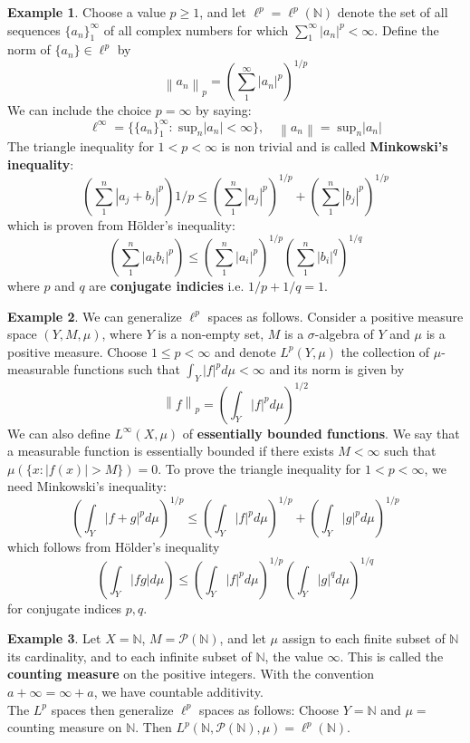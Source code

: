 \documentclass{article}
\theoremstyle{definition}
\newtheorem{example}{Example}
\newcommand{\norm}[1]{\left\lVert#1\right\rVert}
\begin{document}
    \begin{example}
        Choose a value $p\geq 1$, and let $\ell^p = \ell^p(\mathbb{N})$ denote the set of all sequences $\{a_n\}_1^{\infty}$ of all
        complex numbers for which $\sum_1^{\infty} |a_n|^p<\infty$. Define the norm of $\{a_n\}\in \ell^p$ by
        \[ \norm{a_n}_p = (\sum_1^{\infty} |a_n|^p)^{1/p} \]
        We can include the choice $p=\infty$ by saying:
        \[ \ell^{\infty} = \{\{a_n\}_1^{\infty}:\;\text{sup}_n|a_n|<\infty\},\quad \norm{a_n} =\;\text{sup}_n|a_n| \]
        The triangle inequality for $1<p<\infty$ is non trivial and is called \textbf{Minkowski's inequality}:
        \[ (\sum_1^n |a_j+b_j|^p){1/p} \leq (\sum_1^n |a_j|^p)^{1/p} + (\sum_1^n |b_j|^p)^{1/p} \]
        which is proven from Hölder's inequality:
        \[ (\sum_1^n |a_i b_i|^p) \leq (\sum_1^n |a_i|^p)^{1/p} (\sum_1^n|b_i|^q)^{1/q} \]
        where $p$ and $q$ are \textbf{conjugate indicies} i.e. $1/p + 1/q = 1$.
    \end{example}

    \begin{example}
        We can generalize $\ell^p$ spaces as follows. Consider a positive measure space $(Y,M,\mu)$, where $Y$ is a non-empty
        set, $M$ is a $\sigma$-algebra of $Y$ and $\mu$ is a positive measure. Choose $1\leq p<\infty$ and denote $L^p(Y,\mu)$
        the collection of $\mu$-measurable functions such that $\int_Y |f|^pd\mu<\infty$ and its norm is given by
        \[ \norm{f}_p = (\int_Y |f|^p d\mu)^{1/2} \]
        We can also define $L^{\infty}(X,\mu)$ of \textbf{essentially bounded functions}. We say that a measurable function
        is essentially bounded if there exists $M<\infty$ such that $\mu(\{x:|f(x)|>M\})=0$. To prove the triangle inequality
        for $1<p<\infty$, we need Minkowski's inequality:
        \[ (\int_Y |f+g|^pd\mu)^{1/p} \leq (\int_Y |f|^pd\mu)^{1/p} + (\int_Y |g|^pd\mu)^{1/p} \]
        which follows from Hölder's inequality
        \[ (\int_Y |fg|d\mu) \leq (\int_Y |f|^pd\mu)^{1/p}(\int_Y |g|^qd\mu)^{1/q} \]
        for conjugate indices $p,q$.
    \end{example}

    \begin{example}
        Let $X=\mathbb{N}$, $M = \mathcal{P}(\mathbb{N})$, and let $\mu$ assign to each finite subset of $\mathbb{N}$ its
        cardinality, and to each infinite subset of $\mathbb{N}$, the value $\infty$. This is called the \textbf{counting measure} on
        the positive integers. With the convention $a+\infty = \infty+a$, we have countable additivity.\\

        The $L^p$ spaces then generalize $\ell^p$ spaces as follows: Choose $Y=\mathbb{N}$ and $\mu =$ counting measure on $\mathbb{N}$.
        Then $L^p(\mathbb{N},\mathcal{P}(\mathbb{N}),\mu) = \ell^p(\mathbb{N})$.
    \end{example}
\end{document}
